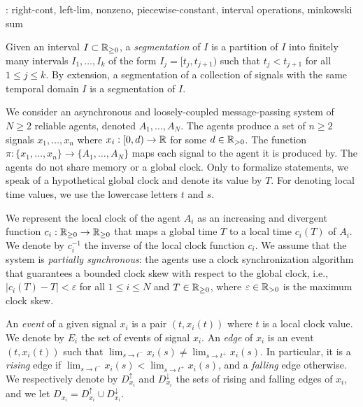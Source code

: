 \TODO: right-cont, left-lim, nonzeno, piecewise-constant, interval operations, minkowski sum

Given an interval $I \subset \mathbb{R}_{\geq 0}$, a \emph{segmentation} of $I$ is a partition of $I$ into finitely many intervals $I_1, \ldots, I_k$ of the form $I_j = [t_j, t_{j+1})$ such that $t_j < t_{j+1}$ for all $1 \leq j \leq k$.
By extension, a segmentation of a collection of signals with the same temporal domain $I$ is a segmentation of $I$.


We consider an asynchronous and loosely-coupled message-passing system of $N \geq 2$ reliable agents, denoted $A_1, \ldots, A_N$.
The agents produce a set of $n \geq 2$ signals $x_1, \ldots, x_n$ where $x_i : [0,d) \to \mathbb{R}$ for some $d \in \mathbb{R}_{> 0}$. 
The function $\pi : \{x_1, \ldots, x_n\} \to \{A_1, \ldots, A_N\}$ maps each signal to the agent it is produced by.
The agents do not share memory or a global clock.
Only to formalize statements, we speak of a hypothetical global clock and denote its value by $T$.
For denoting local time values, we use the lowercase letters $t$ and $s$.

We represent the local clock of the agent $A_i$ as an increasing and divergent function $c_i : \mathbb{R}_{\geq 0} \to \mathbb{R}_{\geq 0}$ that maps a global time $T$ to a local time $c_i(T)$ of $A_i$.
We denote by $c_i^{-1}$ the inverse of the local clock function $c_i$.
We assume that the system is \emph{partially synchronous}: the agents use a clock synchronization algorithm that guarantees a bounded clock skew with respect to the global clock, i.e., $|c_i(T) - T| < \varepsilon$ for all $1 \leq i \leq N$ and $T \in \mathbb{R}_{\geq 0}$, where $\varepsilon \in \mathbb{R}_{> 0}$ is the maximum clock skew.

An \emph{event} of a given signal $x_i$ is a pair $(t, x_i(t))$ where $t$ is a local clock value.
We denote by $E_i$ the set of events of signal $x_i$.
An \emph{edge} of $x_i$ is an event $(t, x_i(t))$ such that $\lim_{s \to t^-} x_i(s) \neq \lim_{s \to t^+} x_i(s)$.
In particular, it is a \emph{rising} edge if $\lim_{s \to t^-} x_i(s) < \lim_{s \to t^+} x_i(s)$, and a \emph{falling} edge otherwise.
We respectively denote by $D_{x_i}^\uparrow$ and $D_{x_i}^\downarrow$ the sets of rising and falling edges of $x_i$, and we let $D_{x_i} = D_{x_i}^\uparrow \cup D_{x_i}^\downarrow$.


